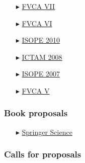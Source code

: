   \begin{itemize}
  
    \item[$\blacktriangleright$] \href{http://www.wias-berlin.de/workshops/fvca7/}{FVCA VII}
    
    \item[$\blacktriangleright$] \href{http://fvca6.fs.cvut.cz/}{FVCA VI}
    
    \item[$\blacktriangleright$] \href{http://www.isope2010.org/}{ISOPE 2010}
    
    \item[$\blacktriangleright$] \href{http://ictam2008.adelaide.edu.au/}{ICTAM 2008}
    
    \item[$\blacktriangleright$] \href{http://www.isope.org/conferences/conferences.htm}{ISOPE 2007}
    
    \item[$\blacktriangleright$] \href{http://www.latp.univ-mrs.fr/fvca5/}{FVCA V}
    
  \end{itemize}

\separator
\subsubsection{Book proposals}

  \begin{itemize}
    \item[$\blacktriangleright$] \href{http://www.springer.com/}{Springer Science}
  \end{itemize}

\separator
\subsubsection{Calls for proposals}

